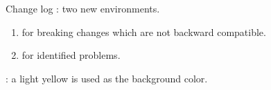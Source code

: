 \documentclass[12pt, a4paper]{tutodoc}
\begin{document}
\begin{tdocnew}
    \item Change log : two new environments.
    \begin{enumerate}
        \item {} for breaking changes which are not backward compatible.

        \item {} for identified problems.
    \end{enumerate}

    \item {}: a light yellow is used as the background color.
\end{tdocnew}
\end{document}
